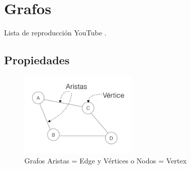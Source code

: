 \documentclass[../main.tex]{subfiles}
\begin{document}
\section{Grafos} 
    Lista de reproducción YouTube \cite{grafos_lista_youtube}.

    \subsection{Propiedades}
    
    \begin{figure}[ht]
        \centering
        \includegraphics[width=0.5\textwidth]{images/grafos/grafo_aristas_vertices.png}
        \caption{Grafos Aristas = Edge y Vértices o Nodos = Vertex }
    \end{figure}
\end{document}
